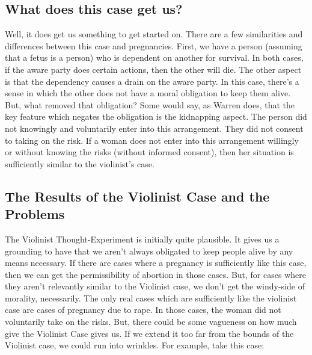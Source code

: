 \subsection{What does this case get us? }

Well, it does get us something to get started on. There are a few similarities and differences between this case and pregnancies. First, we have a person (assuming that a fetus is a person) who is dependent on another for survival. In both cases, if the aware party does certain actions, then the other will die. The other aspect is that the dependency causes a drain on the aware party. In this case, there's a sense in which the other does not have a moral obligation to keep them alive. But, what removed that obligation? Some would say, as Warren does, that the key feature which negates the obligation is the kidnapping aspect. The person did not knowingly and voluntarily enter into this arrangement. They did not consent to taking on the risk.  If a woman does not enter into this arrangement willingly or without knowing the risks (without informed consent), then her situation is sufficiently similar to the violinist's case.

\subsection{The Results of the Violinist Case and the Problems}
The Violinist Thought-Experiment is initially quite plausible. It gives us a grounding to have that we aren't always obligated to keep people alive by any means necessary. If there are cases where a pregnancy is sufficiently like this case, then we can get the permissibility of abortion in those cases. But, for cases where they aren't relevantly similar to the Violinist case, we don't get the windy-side of morality, necessarily. The only real cases which are sufficiently like the violinist case are cases of pregnancy due to rape. In those cases, the woman did not voluntarily take on the risks. But, there could be some vagueness on how much give the Violinist Case gives us. If we extend it too far from the bounds of the Violinist case, we could run into wrinkles. For example, take this case: 


